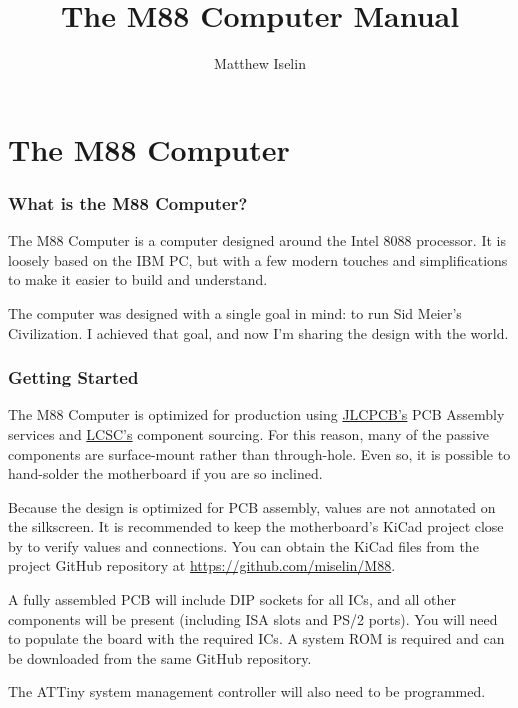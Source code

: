 \documentclass[twoside,10pt,letterpaper]{refart}
\title{The {\codefamily M88} Computer Manual}
\author{Matthew Iselin}
\date{}
\begin{document}
\maketitle
\raggedright
\footnotesize

\tableofcontents

\newpage

\part{The {\codefamily M88} Computer}

\section{What is the {\codefamily M88} Computer?}
The {\codefamily M88} Computer is a computer designed around the Intel 8088 processor.
It is loosely based on the IBM PC, but with a few modern touches and simplifications
to make it easier to build and understand.

The computer was designed with a single goal in mind: to run Sid Meier's Civilization.
I achieved that goal, and now I'm sharing the design with the world.

\section{Getting Started}
The {\codefamily M88} Computer is optimized for production using \href{https://jlcpcb.com}{JLCPCB's}
PCB Assembly services and \href{https://lcsc.com}{LCSC's} component sourcing. For this reason,
many of the passive components are surface-mount rather than through-hole. Even so, it is
possible to hand-solder the motherboard if you are so inclined.

Because the design is optimized for PCB assembly, values are not annotated on the silkscreen.
It is recommended to keep the motherboard's KiCad project close by to verify values and connections.
You can obtain the KiCad files from the project GitHub repository at \url{https://github.com/miselin/M88}.

A fully assembled PCB will include DIP sockets for all ICs, and all other components will be
present (including ISA slots and PS/2 ports). You will need to populate the board with the
required ICs. A system ROM is required and can be downloaded from the same GitHub repository.

The ATTiny system management controller will also need to be programmed.
\end{document}
